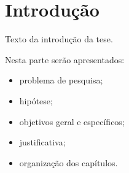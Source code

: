 \chapter{Introdução}

\thispagestyle{headings}

Texto da introdução da tese.

Nesta parte serão apresentados:

\begin{itemize}
    \item problema de pesquisa;
    \item hipótese;
    \item objetivos geral e específicos;
    \item justificativa;
    \item organização dos capítulos.
\end{itemize}
